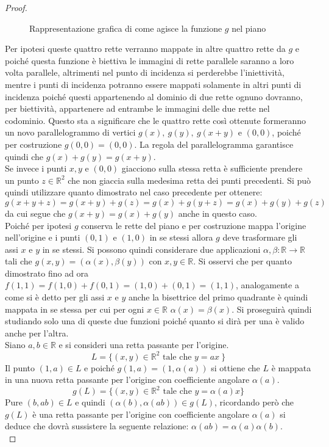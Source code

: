 \begin{proof}
\begin{figure}[h!]
\begin{tikzpicture}[scale=0.8]
	\end{tikzpicture}
	\caption{Rappresentazione grafica di come agisce la funzione $g$ nel piano}
	\label{Fig:PianoLinGen}
	\end{figure}
	Per ipotesi queste quattro rette verranno mappate in altre quattro rette da $g$ e poiché questa funzione è biettiva le immagini di rette parallele saranno a loro volta parallele, altrimenti nel punto di incidenza si perderebbe l'iniettività, mentre i punti di incidenza potranno essere mappati solamente in altri punti di incidenza poiché questi appartenendo al dominio di due rette ognuno dovranno, per biettività, appartenere ad entrambe le immagini delle due rette nel codominio. Questo sta a significare che le quattro rette così ottenute formeranno un novo parallelogrammo di vertici $g(x),\ g(y),\ g(x+y)$ e $(0,0)$, poiché per costruzione $g(0,0)=(0,0)$. La regola del parallelogramma garantisce quindi che $g(x)+g(y)=g(x+y)$.\\
	Se invece i punti $x,y$ e $(0,0)$ giacciono sulla stessa retta è sufficiente prendere un punto $z\in \mathbb{R}^2$ che non giaccia sulla medesima retta dei punti precedenti. Si può quindi utilizzare quanto dimostrato nel caso precedente per ottenere:
	\begin{equation*}
		g(x+y+z)=g(x+y)+g(z)= g(x)+g(y+z)=g(x)+g(y)+g(z)
	\end{equation*}
	da cui segue che $g(x+y)=g(x)+g(y)$ anche in questo caso.\\

    Poiché per ipotesi $g$ conserva le rette del piano e per costruzione mappa l'origine nell'origine e i punti $(0,1)$ e $(1,0)$ in se stessi allora $g$ deve trasformare gli assi $x$ e $y$ in se stessi. Si possono quindi considerare due applicazioni $\alpha,\beta:\mathbb{R} \rightarrow\mathbb{R} $ tali che $g(x,y)=(\alpha(x),\beta(y))$ con  $x,y\in\mathbb{R}$. Si osservi che per quanto dimostrato fino ad ora $f(1,1)=f(1,0)+f(0,1)=(1,0)+(0,1)=(1,1)$, analogamente a come si è detto per gli assi $x$ e $y$ anche la bisettrice del primo quadrante è quindi mappata in se stessa per cui per ogni $x\in\mathbb{R}$ $\alpha(x)=\beta(x)$. Si proseguirà quindi studiando solo una di queste due funzioni poiché quanto si dirà per una è valido anche per l'altra.\\

	Siano $a,b\in\mathbb{R}$ e si consideri una retta passante per l'origine.
	\begin{equation*}
		L=\{ (x,y)\in\mathbb{R}^2 \text{ tale che } y=ax\  \}
	\end{equation*}
    Il punto $(1,a)\in L$ e poiché $g(1,a)=(1,\alpha(a))$ si ottiene che $L$ è mappata in una nuova retta passante per l'origine con coefficiente angolare $\alpha(a)$.
	\begin{equation*}
		g(L)=\{ (x,y)\in\mathbb{R}^2 \text{ tale che } y=\alpha(a)x\}
	\end{equation*} 
	Pure $(b,ab)\in L$ e quindi $(\alpha(b),\alpha(ab))\in g(L)$, ricordando però che $g(L)$ è una retta passante per l'origine con coefficiente angolare $\alpha(a)$ si deduce che dovrà sussistere la seguente relazione: $\alpha(ab)=\alpha(a)\alpha(b)$.\\


\end{proof}
